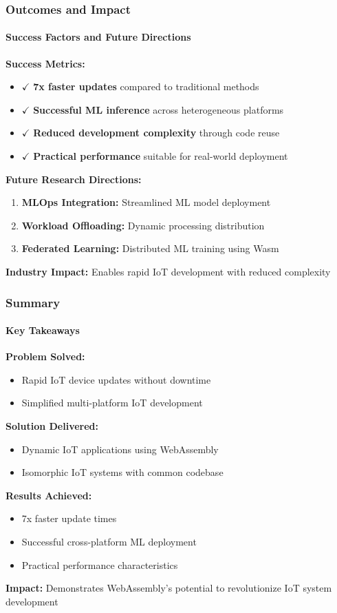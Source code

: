 \documentclass{beamer}
\begin{document}
\begin{frame}
\frametitle{Outcomes and Impact}
\framesubtitle{Success Factors and Future Directions}

\textbf{Success Metrics:}
\begin{itemize}
\item $\checkmark$ \textbf{7x faster updates} compared to traditional methods
\item $\checkmark$ \textbf{Successful ML inference} across heterogeneous platforms
\item $\checkmark$ \textbf{Reduced development complexity} through code reuse
\item $\checkmark$ \textbf{Practical performance} suitable for real-world deployment
\end{itemize}

\textbf{Future Research Directions:}
\begin{enumerate}
\item \textbf{MLOps Integration:} Streamlined ML model deployment
\item \textbf{Workload Offloading:} Dynamic processing distribution
\item \textbf{Federated Learning:} Distributed ML training using Wasm
\end{enumerate}

\textbf{Industry Impact:} Enables rapid IoT development with reduced complexity
\end{frame}

\begin{frame}
\frametitle{Summary}
\framesubtitle{Key Takeaways}

\textbf{Problem Solved:}
\begin{itemize}
\item Rapid IoT device updates without downtime
\item Simplified multi-platform IoT development
\end{itemize}

\textbf{Solution Delivered:}
\begin{itemize}
\item Dynamic IoT applications using WebAssembly
\item Isomorphic IoT systems with common codebase
\end{itemize}

\textbf{Results Achieved:}
\begin{itemize}
\item 7x faster update times
\item Successful cross-platform ML deployment
\item Practical performance characteristics
\end{itemize}

\textbf{Impact:} Demonstrates WebAssembly's potential to revolutionize IoT system development
\end{frame}
\end{document}
